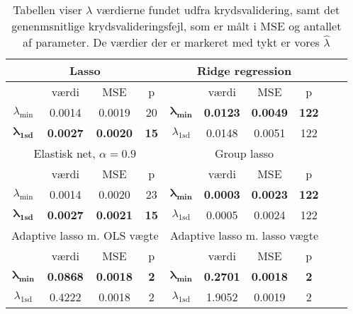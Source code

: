 \begin{table}
\center
\begin{tabular}{cccc | cccccc}
\toprule
   \multicolumn{4}{c}{Lasso} &  \multicolumn{4}{c}{Ridge regression}  \\ \midrule
 & værdi & MSE & p & & 	værdi & MSE & p \\
 $\lambda_{\min}$ &0.0014& 0.0019 & 20 &	$\boldsymbol{\lambda_{\min}}$ &  \textbf{0.0123} &   \textbf{0.0049} &  \textbf{122} \\ 
 $\boldsymbol{\lambda_{1 \text{sd}}}$ & \textbf{0.0027} & \textbf{0.0020} & \textbf{15} & $\lambda_{1 \text{sd}}$& 0.0148 & 0.0051 & 122  \\ \bottomrule \toprule
    \multicolumn{4}{c}{Elastisk net, $\alpha = 0.9$}  &  \multicolumn{4}{c}{Group lasso}  \\ \midrule
 & værdi & MSE & p && værdi & MSE & p \\
 $\lambda_{\min}$ & 0.0014 & 0.0020 & 23 & $\boldsymbol{\lambda_{\min}}$& \textbf{0.0003} & \textbf{0.0023}  & \textbf{122} \\
  $\boldsymbol{\lambda_{1\text{sd}}}$ & \textbf{0.0027} & \textbf{0.0021} & \textbf{15} &   $\lambda_{1\text{sd}}$  & 0.0005 & 0.0024 & 122 \\  \bottomrule \toprule
  \multicolumn{4}{c}{Adaptive lasso m. OLS vægte}  &  \multicolumn{4}{c}{Adaptive lasso m. lasso vægte}  \\ \midrule
  & værdi & MSE & p & & værdi & MSE & p \\
 $\boldsymbol{\lambda_{\min}}$  & \textbf{0.0868} & \textbf{0.0018} & \textbf{2} &  $\boldsymbol{\lambda_{\min}}$   &   \textbf{0.2701} &  \textbf{0.0018} &  \textbf{2}   \\
 $\lambda_{1\text{sd}}$ & 0.4222 & 0.0018 & 2 & $\lambda_{1\text{sd}}$  & 1.9052 & 0.0019 & 2  \\ \bottomrule
 \end{tabular}
\caption{Tabellen viser $\lambda$ værdierne fundet udfra krydsvalidering, samt det genenmsnitlige krydsvalideringsfejl, som er målt i MSE og antallet af parameter. De værdier der er markeret med tykt er vores $\widehat{\lambda}$} \label{tab:cv_tab}
\end{table}
